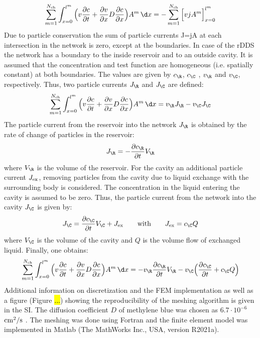 \begin{align}
  \sum_{m=1}^{N_{\rm ch}} \int_{x=0}^{l^m}  \Big( v\frac{\partial c}{\partial t} + \frac{\partial v}{\partial x}D\frac{\partial c}{\partial x} \Big) A^m \, \d x = - \sum_{m=1}^{N_{\rm ch}} \Big[ vjA^m\Big]_{x=0}^{l^m}
\end{align}
Due to particle conservation the sum of particle currents J=jA at each intersection in the network is zero, except at the boundaries. In case of the rDDS the network has a boundary to the inside reservoir and to an outside cavity. It is assumed that the concentration and test function are homogeneous (i.e. spatially constant) at both boundaries. The values are given by $c_{\R}$, $c_\C$ , $v_\R$ and $v_\C$, respectively. Thus, two particle currents $J_\R$ and $J_\C$ are defined:
\begin{align}
  \sum_{m=1}^{N_{\rm ch}} \int_{x=0}^{l^m}  \Big( v\frac{\partial c}{\partial t} + \frac{\partial v}{\partial x}D\frac{\partial c}{\partial x} \Big) A^m \, \d x = v_\R J_\R - v_\C J_\C
\end{align}
The particle current from the reservoir into the network $J_\R$ is obtained by the rate of change of particles in the reservoir:
\begin{align}
  J_\R = -\frac{\partial c_\R}{\partial t} V_\R
\end{align}
where $V_\R$ is the volume of the reservoir. For the cavity an additional particle current $J_{\rm ex}$, removing particles from the cavity due to liquid exchange with the surrounding body is considered. The concentration in the liquid entering the cavity is assumed to be zero. Thus, the particle current from the network into the cavity $J_\C$ is given by:
\begin{align}
  J_\C = \frac{\partial c_\C}{\partial t} V_\C + J_{\rm ex} \qquad \text{with} \qquad J_{\rm ex} = c_\C Q
\end{align}
where $V_\C$ is the volume of the cavity and $Q$ is the volume flow of exchanged liquid. Finally, one obtains:
\begin{align}
  \sum_{m=1}^{N_{\rm ch}} \int_{x=0}^{l^m}  \Big( v\frac{\partial c}{\partial t} + \frac{\partial v}{\partial x}D\frac{\partial c}{\partial x} \Big) A^m \, \d x = -v_\R \frac{\partial c_\R}{\partial t} V_\R - v_\C \Big( \frac{\partial c_\C}{\partial t} + c_\C Q\Big)
\end{align}
Additional information on discretization and the FEM implementation as well as a figure (Figure \hl{...}) showing the reproducibility of the meshing algorithm is given in the SI. The diffusion coefficient $D$ of methylene blue was chosen as $6.7\cdot10^{-6}$~${\rm cm^2/s}$ \supercite{selifonov2019determination}. The meshing was done using Fortran and the finite element model was implemented in Matlab (The MathWorks Inc., USA, version R2021a).

